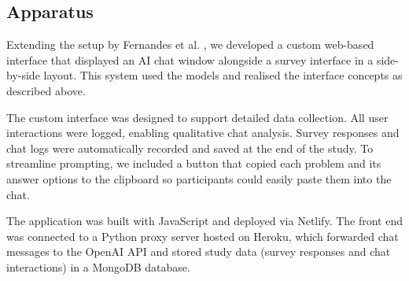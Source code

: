 \documentclass[acmlarge,review=true, anonymous=true]{acmart}
\begin{document}
\subsection{Apparatus}


Extending the setup by Fernandes et al. \cite{FERNANDES2026108779}, we developed a custom web-based interface that displayed an AI chat window alongside a survey interface in a side-by-side layout. This system used the models and realised the interface concepts as described above.



The custom interface was designed to support detailed data collection. All user interactions were logged, enabling qualitative chat analysis. Survey responses and chat logs were automatically recorded and saved at the end of the study. To streamline prompting, we included a button that copied each problem and its answer options to the clipboard so participants could easily paste them into the chat.

The application was built with JavaScript and deployed via Netlify. The front end was connected to a Python proxy server hosted on Heroku, which forwarded chat messages to the OpenAI API and stored study data (survey responses and chat interactions) in a MongoDB database.
\end{document}
